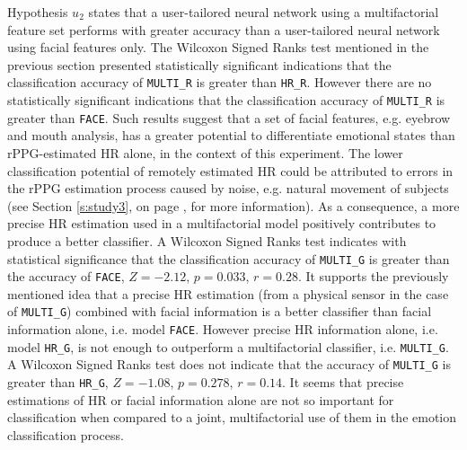 Hypothesis $u_2$ states that a user-tailored neural network using a multifactorial feature set performs with greater accuracy than a user-tailored neural network using facial features only. The Wilcoxon Signed Ranks test mentioned in the previous section presented statistically significant indications that the classification accuracy of \texttt{MULTI\_R} is greater than \texttt{HR\_R}. However there are no statistically significant indications that the classification accuracy of \texttt{MULTI\_R} is greater than \texttt{FACE}. Such results suggest that a set of facial features, e.g. eyebrow and mouth analysis, has a greater potential to differentiate emotional states than rPPG-estimated HR alone, in the context of this experiment. The lower classification potential of remotely estimated HR could be attributed to errors in the rPPG estimation process caused by noise, e.g. natural movement of subjects (see Section \ref{s:study3}, on page \pageref{s:study3}, for more information). As a consequence, a more precise HR estimation used in a multifactorial model positively contributes to produce a better classifier. A Wilcoxon Signed Ranks test indicates with statistical significance that the classification accuracy of \texttt{MULTI\_G} is greater than the accuracy of \texttt{FACE}, $Z=-2.12$, $p=0.033$, $r=0.28$. It supports the previously mentioned idea that a precise HR estimation (from a physical sensor in the case of \texttt{MULTI\_G}) combined with facial information is a better classifier than facial information alone, i.e. model \texttt{FACE}. However precise HR information alone, i.e. model \texttt{HR\_G}, is not enough to outperform a multifactorial classifier, i.e. \texttt{MULTI\_G}. A Wilcoxon Signed Ranks test does not indicate that the accuracy of \texttt{MULTI\_G} is greater than \texttt{HR\_G}, $Z=-1.08$, $p=0.278$, $r=0.14$. It seems that precise estimations of HR or facial information alone are not so important for classification when compared to a joint, multifactorial use of them in the emotion classification process.

